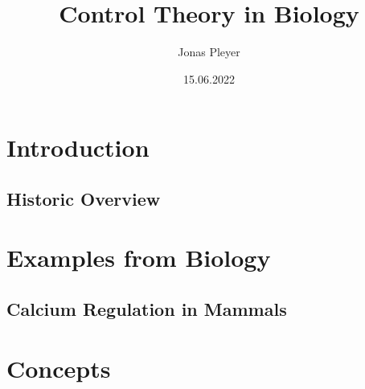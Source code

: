 \documentclass[10pt, compress]{beamer}
\title{Control Theory in Biology}
\subtitle{}
\date{15.06.2022}
\author{Jonas Pleyer}
\institute{Freiburg Center for Data Analysis and Modeling (FDM)}
\begin{document}
\maketitle

\section{Introduction}
\label{sec:introduction}
\subsection{Historic Overview}
\label{subsec:introduction-history}
\begin{frame}{\insertsubsection}
	
\end{frame}
%
%
\begin{frame}{\insertsubsection}
	
\end{frame}
%
%
\section{Examples from Biology}
\label{sec:examples}
\subsection{Calcium Regulation in Mammals}
\begin{frame}{\insertsubsection}

\end{frame}
%
%
\section{Concepts}
\label{sec:concepts}
\end{document}
